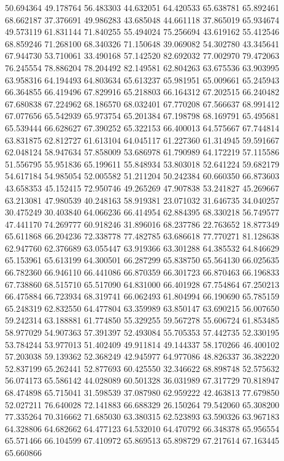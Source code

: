 50.694364
49.178764
56.483303
44.632051
64.420533
65.638781
65.892461
68.662187
37.376691
49.986283
43.685048
44.661118
37.865019
65.934674
49.573119
61.831144
71.840255
55.494024
75.256694
43.619162
55.412546
68.859246
71.268100
68.340326
71.150648
39.069082
54.302780
43.345641
67.944730
53.710061
33.490168
57.142520
82.692032
77.002970
79.472063
76.245554
78.886204
78.204492
82.149581
62.804263
63.675536
63.903995
63.958316
64.194493
64.803634
65.613237
65.981951
65.009661
65.245943
66.364855
66.419496
67.829916
65.218803
66.164312
67.202515
66.240482
67.680838
67.224962
68.186570
68.032401
67.770208
67.566637
68.991412
67.077656
65.542939
65.973754
65.201384
67.198798
68.169791
65.495681
65.539444
66.628627
67.390252
65.322153
66.400013
64.575667
67.744814
63.831875
62.812727
61.613104
64.045117
61.227360
61.314945
59.591667
62.048124
58.947634
57.858009
53.686978
61.790989
64.172219
57.115586
51.556795
55.951836
65.199611
55.848934
53.803018
52.641224
59.682179
54.617184
54.985054
52.005582
51.211204
50.242384
60.660350
66.873603
43.658353
45.152415
72.950746
49.265269
47.907838
53.241827
45.269667
63.213081
47.980539
40.248163
58.919381
23.071032
31.646735
34.040257
30.475249
30.403840
64.066236
66.414954
62.884395
68.330218
56.749577
47.441170
74.269777
60.918246
31.896016
68.237786
22.763652
18.877349
65.611868
66.204236
72.338778
77.482785
63.686618
77.770271
81.128638
62.947760
62.376689
63.055447
63.919366
63.301288
64.385532
64.846629
65.153961
65.613199
64.300501
66.287299
65.838750
65.564130
66.025635
66.782360
66.946110
66.441086
66.870359
66.301723
66.870463
66.196833
67.738860
68.515710
65.517090
64.831000
66.401928
67.754864
67.250213
66.475884
66.723934
68.319741
66.062493
61.804994
66.190690
65.785159
65.248319
62.832550
64.477804
63.359989
63.850147
63.690215
56.007650
59.242314
63.188881
61.774850
55.329255
59.567278
55.606724
61.853485
58.977029
54.907363
57.391397
52.493084
55.705353
57.442735
52.330195
53.784244
53.977013
51.402409
49.911814
49.144337
58.170266
46.400102
57.203038
59.139362
52.368249
42.945977
64.977086
48.826337
36.382220
52.837199
65.262441
52.877693
60.425550
32.346622
68.898748
52.575632
56.074173
65.586142
44.028089
60.501328
36.031989
67.317729
70.818947
68.474898
65.715041
31.598539
37.087980
62.959222
42.463813
77.679850
52.027211
76.640028
72.141883
66.688329
26.150264
79.542060
65.308200
77.335264
70.316662
71.685030
63.380315
62.523893
63.590326
63.967183
64.328806
64.682662
64.477123
64.532010
64.470792
66.348378
65.956554
65.571466
66.104599
67.410972
65.869513
65.898729
67.217614
67.163445
65.660866
